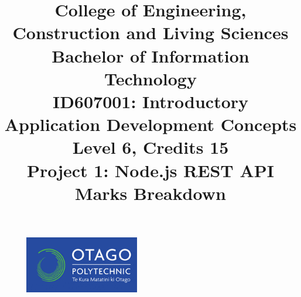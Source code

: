 \documentclass{article}
\author{}
\begin{document}
\begin{figure}
  \centering
  \includegraphics[width=50mm]{../img/logo.png}
\end{figure}

\title{College of Engineering, Construction and Living Sciences\\Bachelor of Information Technology\\ID607001: Introductory Application Development Concepts\\Level 6, Credits 15\\\textbf{Project 1: Node.js REST API Marks Breakdown}}
\date{}
\maketitle
\end{document}

